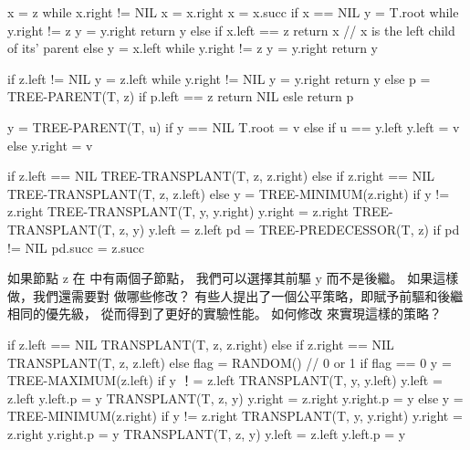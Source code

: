 \startCLRS
x = z
while x.right != NIL
	x = x.right
x = x.succ
if x == NIL
	y = T.root
	while y.right != z
		y = y.right
	return y
else
	if x.left == z
		return x	// x is the left child of its' parent
	else
		y = x.left
		while y.right != z
			y = y.right
		return y
\stopCLRS

\startCLRS
if z.left != NIL
	y = z.left
	while y.right != NIL
		y = y.right
	return y
else
	p = TREE-PARENT(T, z)
	if p.left == z
		return NIL
	esle
		return p
\stopCLRS

\startCLRS
y = TREE-PARENT(T, u)
if y == NIL
	T.root = v
else if u == y.left
	y.left = v
else
	y.right = v
\stopCLRS

\startCLRS
if z.left == NIL
	TREE-TRANSPLANT(T, z, z.right)
else if z.right == NIL
	TREE-TRANSPLANT(T, z, z.left)
else
	y = TREE-MINIMUM(z.right)
	if y != z.right
		TREE-TRANSPLANT(T, y, y.right)
		y.right = z.right
	TREE-TRANSPLANT(T, z, y)
	y.left = z.left
pd = TREE-PREDECESSOR(T, z)
if pd != NIL
	pd.succ = z.succ
\stopCLRS
\stopANSWER

\startEXERCISE
如果節點 z 在  中有兩個子節點，
我們可以選擇其前驅 y 而不是後繼。
如果這樣做，我們還需要對  做哪些修改？
有些人提出了一個公平策略，即賦予前驅和後繼相同的優先級，
從而得到了更好的實驗性能。
如何修改  來實現這樣的策略？
\stopEXERCISE

\startANSWER
{}
\startCLRS
if z.left == NIL
	TRANSPLANT(T, z, z.right)
else if z.right == NIL
	TRANSPLANT(T, z, z.left)
else
	flag = RANDOM()		// 0 or 1
	if flag == 0
		y = TREE-MAXIMUM(z.left)
		if y ！= z.left
			TRANSPLANT(T, y, y.left)
			y.left = z.left
			y.left.p = y
		TRANSPLANT(T, z, y)
		y.right = z.right
		y.right.p = y
	else
		y = TREE-MINIMUM(z.right)
		if y != z.right
			TRANSPLANT(T, y, y.right)
			y.right = z.right
			y.right.p = y
		TRANSPLANT(T, z, y)
		y.left = z.left
		y.left.p = y
\stopCLRS
\stopANSWER

\stopsection
